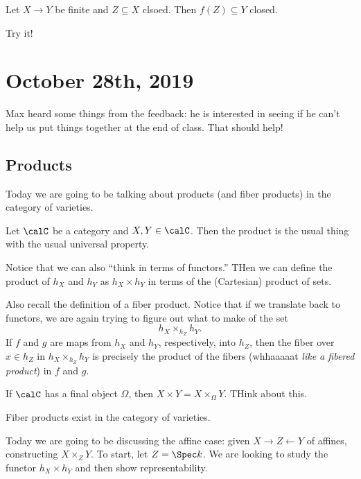 \documentclass[12pt]{article}
\begin{document}
\begin{prop}
	Let $X\to Y$ be finite and $Z\subseteq X$ clsoed. Then $f(Z)\subseteq Y$ closed.
\end{prop}
Try it!

\section{October 28th, 2019}
Max heard some things from the feedback: he is interested in seeing if he can't help us 
put things together at the end of class. That should help!

\subsection{Products}
Today we are going to be talking about products (and fiber products) in the category of varieties. 
\begin{defn}
	Let $\calC$ be a category and $X,Y\in\calC$. Then the product is the usual thing with the usual universal property.
	\begin{center}
	\end{center}
\end{defn}
\begin{rmk}
	Notice that we can also ``think in terms of functors.'' THen we can define the product of $h_X$ and $h_Y$ as $h_X\times h_Y$ 
	in terms of the (Cartesian) product of sets.
\end{rmk}
Also recall the definition of a fiber product. Notice that if we translate back to functors, we are again trying to figure out what to 
make of the set 
\[h_X\times_{h_Z}h_Y.\]
If $f$ and $g$ are maps from $h_X$ and $h_Y$, respectively, into $h_Z$, then the fiber over $x\in h_Z$ in $h_X\times_{h_Z}h_Y$
is precisely the product of the fibers (whhaaaaat \textit{like a fibered product}) in $f$ and $g$.

\begin{prob}
	If $\calC$ has a final object $\Omega$, then $X\times Y=X\times_\Omega Y$. THink about this.
\end{prob}
\begin{thm}
	Fiber products exist in the category of varieties.
\end{thm}
Today we are going to be discussing the affine case: given $X\to Z\leftarrow Y$ of affines, constructing 
$X\times_Z Y$. To start, let $Z=\Spec k$. We are looking to study the functor $h_X\times h_Y$ and then show representability.
\end{document}
